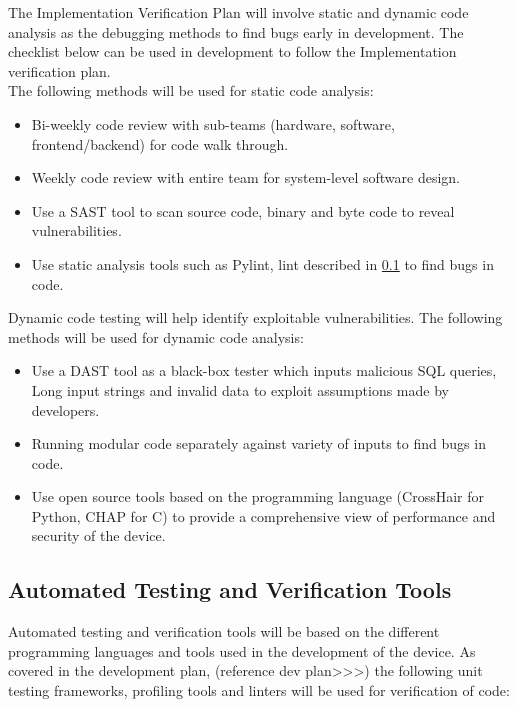 \documentclass[12pt, titlepage]{article}
\begin{document}
The Implementation Verification Plan will involve static and dynamic code analysis as the debugging methods to find bugs early in development. The checklist below can be used in development to follow the Implementation verification plan.\\
The following methods will be used for static code analysis:
\begin{itemize}
\item Bi-weekly code review with sub-teams (hardware, software, frontend/backend) for code walk through.
\item Weekly code review with entire team for system-level software design.
\item Use a SAST tool to scan source code, binary and byte code to reveal vulnerabilities.
\item Use static analysis tools such as Pylint, lint described in \ref{Automation} to find bugs in code.
\end{itemize}
Dynamic code testing will help identify exploitable vulnerabilities. The following methods will be used for dynamic code analysis:
\begin{itemize}
\item Use a DAST tool as a black-box tester which inputs malicious SQL queries, Long input strings and invalid data to exploit assumptions made by developers.
\item Running modular code separately against variety of inputs to find bugs in code.
\item Use open source tools based on the programming language (CrossHair for Python, CHAP for C) to provide a comprehensive view of performance and security of the device.
\end{itemize}


\subsection{Automated Testing and Verification Tools}\label{Automation}

Automated testing and verification tools will be based on the different programming languages and tools used in the development of the device. As covered in the development plan, (reference dev plan>>>) the following unit testing frameworks, profiling tools and linters will be used for verification of code:
\end{document}
